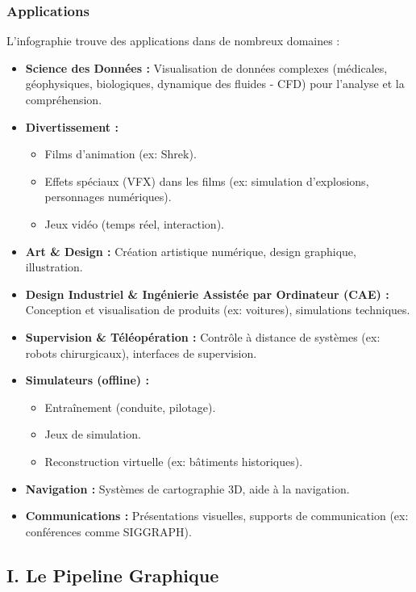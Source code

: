 \documentclass{article}
\begin{document}
\subsubsection{Applications}

L'infographie trouve des applications dans de nombreux domaines :
\begin{itemize}
    \item \textbf{Science des Données :} Visualisation de données complexes (médicales, géophysiques, biologiques, dynamique des fluides - CFD) pour l'analyse et la compréhension.
    \item \textbf{Divertissement :}
    \begin{itemize}
        \item Films d'animation (ex: Shrek).
        \item Effets spéciaux (VFX) dans les films (ex: simulation d'explosions, personnages numériques).
        \item Jeux vidéo (temps réel, interaction).
    \end{itemize}
    \item \textbf{Art \& Design :} Création artistique numérique, design graphique, illustration.
    \item \textbf{Design Industriel \& Ingénierie Assistée par Ordinateur (CAE) :} Conception et visualisation de produits (ex: voitures), simulations techniques.
    \item \textbf{Supervision \& Téléopération :} Contrôle à distance de systèmes (ex: robots chirurgicaux), interfaces de supervision.
    \item \textbf{Simulateurs (offline) :}
    \begin{itemize}
        \item Entraînement (conduite, pilotage).
        \item Jeux de simulation.
        \item Reconstruction virtuelle (ex: bâtiments historiques).
    \end{itemize}
    \item \textbf{Navigation :} Systèmes de cartographie 3D, aide à la navigation.
    \item \textbf{Communications :} Présentations visuelles, supports de communication (ex: conférences comme SIGGRAPH).
\end{itemize}

\subsection{I. Le Pipeline Graphique}
\end{document}

